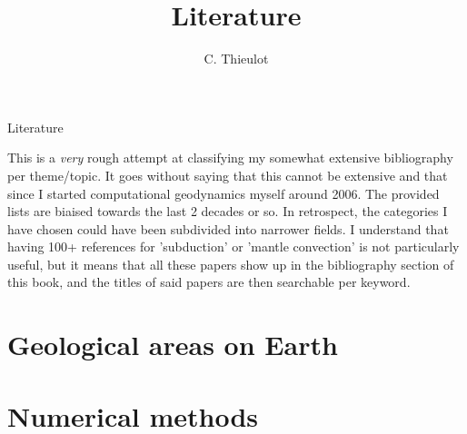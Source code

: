 \documentclass[a4paper,12pt]{report}
\title{Literature}
\author{C. Thieulot}
\begin{document}
\thispagestyle{empty}

\begin{center}
{\large Literature}
\end{center}

\newpage

\tableofcontents

\newpage
This is a {\it very} rough attempt at classifying my somewhat extensive 
bibliography per theme/topic.
It goes without saying that this cannot be extensive and that since I 
started computational geodynamics myself around 2006. 
The provided lists are biaised towards the last 2 decades or so. 
In retrospect, the categories I have chosen could have been subdivided
into narrower fields. I understand that having 100+ references 
for 'subduction'  or 'mantle convection' is not particularly useful, 
but it means that all these papers show up in the bibliography section 
of this book, and the titles of said papers are then searchable per keyword.




\chapter{Geological areas on Earth} 

\chapter{Numerical methods} 




\printbibliography
\end{document}
